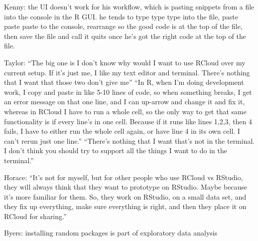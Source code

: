 Kenny: the UI doesn't work for his workflow, which is pasting snippets from a file into the console in the R GUI.  he tends to type type type into the file, paste paste paste to the console, rearrange so the good code is at the top of the file, then save the file and call it quits once he's got the right code at the top of the file.

Taylor: ``The big one is I don't know why would I want to use RCloud over my current setup. If it's just me, I like my text editor and terminal. There's nothing that I want that those two don't give me'' ``In R, when I'm doing development work, I copy and paste in like 5-10 lines of code, so when something breaks, I get an error message on that one line, and I can up-arrow and change it and fix it, whereas in RCloud I have to run a whole cell, so the only way to get that same functionality is if every line's in one cell. Because if it runs like lines 1,2,3, then 4 fails, I have to either run the whole cell again, or have line 4 in its own cell. I can't rerun just one line.'' ``There's nothing that I want that's not in the terminal. I don't think you should try to support all the things I want to do in the terminal.''

Horace: ``It's not for myself, but for other people who use RCloud vs RStudio, they will always think that they want to prototype on RStudio. Maybe because it's more familiar for them. So, they work on RStudio, on a small data set, and they fix up everything, make sure everything is right, and then they place it on RCloud for sharing.''

Byers: installing random packages is part of exploratory data analysis


